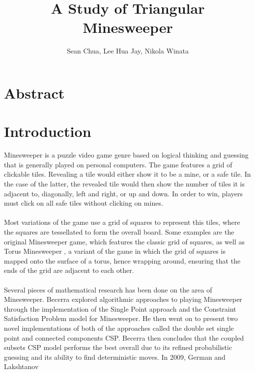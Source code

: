 \documentclass{article}
\title{A Study of Triangular Minesweeper}
\author{Sean Chua, Lee Hua Jay, Nikola Winata}
\begin{document}
\maketitle

\section{Abstract}

\newpage
\section{Introduction}
Minesweeper is a puzzle video game genre based on logical thinking and guessing that is generally played on personal computers. 
The game features a grid of clickable tiles. Revealing a tile would either show it to 
be a mine, or a safe tile. \parencite{minesweeper} In the case of the latter, the revealed tile would then show the number of tiles it is adjacent to,
diagonally, left and right, or up and down.
In order to win, players must click on all safe tiles without clicking on mines. \\\\
Most variations of the game use a grid of squares to represent this tiles, where the squares are tessellated to form
the overall board. Some examples are the original Minesweeper game, which features the classic grid of squares,
as well as Torus Minesweeper \parencite{torusminesweeper}, a variant of the game in which the grid of squares is mapped onto the surface of a torus,
hence wrapping around, ensuring that the ends of the grid are adjacent to each other. \\\\
Several pieces of mathematical research has been done on the area of Minesweeper. Becerra \parencite{becerra} explored algorithmic approaches
to playing Minesweeper through the implementation of the Single Point approach and the Constraint Satisfaction Problem model for Minesweeper.
He then went on to present two novel implementations of both of the approaches called the double set single point and connected components CSP. 
Becerra then concludes that the coupled subsets CSP model performs the best overall due to its refined probabilistic guessing and 
its ability to find deterministic moves. In 2009, German and Lakshtanov 

\printbibliography
\end{document}
